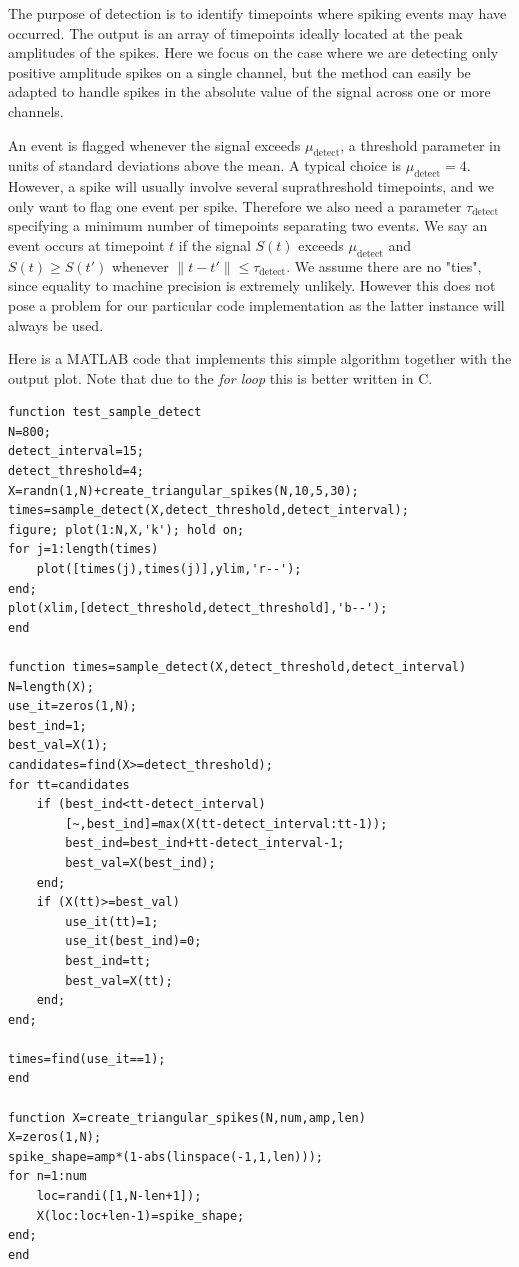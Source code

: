 \documentclass{article}
\begin{document}
The purpose of detection is to identify timepoints where spiking events may have occurred. The output is an array of timepoints ideally located at the peak amplitudes of the spikes. Here we focus on the case where we are detecting only positive amplitude spikes on a single channel, but the method can easily be adapted to handle spikes in the absolute value of the signal across one or more channels.

An event is flagged whenever the signal exceeds $\mu_{\text{detect}}$, a threshold parameter in units of standard deviations above the mean. A typical choice is $\mu_{\text{detect}}=4$. However, a spike will usually involve several suprathreshold timepoints, and we only want to flag one event per spike. Therefore we also need a parameter $\tau_{\text{detect}}$ specifying a minimum number of timepoints separating two events. We say an event occurs at timepoint $t$ if the signal $S(t)$ exceeds
$\mu_{\text{detect}}$ and $S(t)\geq S(t')$ whenever $\|t-t'\|\leq \tau_{\text{detect}}$. We assume there are no "ties", since equality to machine precision is extremely unlikely. However this does not pose a problem for our particular code implementation as the latter instance will always be used.

Here is a MATLAB code that implements this simple algorithm together with the output plot. Note that due to the \emph{for loop} this is better written in C.

\begin{lstlisting}
function test_sample_detect
N=800;
detect_interval=15;
detect_threshold=4;
X=randn(1,N)+create_triangular_spikes(N,10,5,30);
times=sample_detect(X,detect_threshold,detect_interval);
figure; plot(1:N,X,'k'); hold on;
for j=1:length(times)
    plot([times(j),times(j)],ylim,'r--');
end;
plot(xlim,[detect_threshold,detect_threshold],'b--');
end

function times=sample_detect(X,detect_threshold,detect_interval)
N=length(X);
use_it=zeros(1,N);
best_ind=1;
best_val=X(1);
candidates=find(X>=detect_threshold);
for tt=candidates
    if (best_ind<tt-detect_interval)
        [~,best_ind]=max(X(tt-detect_interval:tt-1));
        best_ind=best_ind+tt-detect_interval-1;
        best_val=X(best_ind);
    end;
    if (X(tt)>=best_val)
        use_it(tt)=1;
        use_it(best_ind)=0;
        best_ind=tt;
        best_val=X(tt);
    end;
end;

times=find(use_it==1);
end

function X=create_triangular_spikes(N,num,amp,len)
X=zeros(1,N);
spike_shape=amp*(1-abs(linspace(-1,1,len)));
for n=1:num
    loc=randi([1,N-len+1]);
    X(loc:loc+len-1)=spike_shape;
end;
end
\end{lstlisting}
\end{document}
